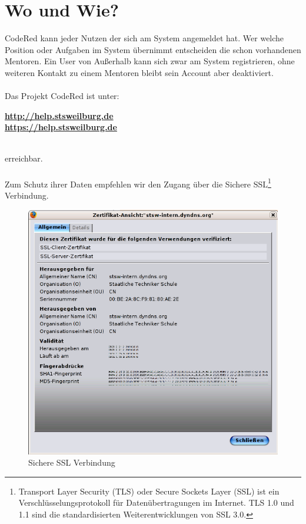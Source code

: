 \chapter{Wo und Wie?}  %
\label{chapter:Wo und Wie?}  %

CodeRed kann jeder Nutzen der sich am System angemeldet hat. Wer welche Position oder Aufgaben im System übernimmt entscheiden die schon vorhandenen Mentoren. Ein User von Außerhalb kann sich zwar am System registrieren, ohne weiteren Kontakt zu einem Mentoren bleibt sein Account aber deaktiviert.\\
\\
Das Projekt CodeRed ist unter:\\
\centerline{\href{http://help.stsweilburg.de}{\textbf{http://help.stsweilburg.de}}\\ \href{https://help.stsweilburg.de}{\textbf{https://help.stsweilburg.de}}} \\
erreichbar.\\
\\ 
Zum Schutz ihrer Daten empfehlen wir den Zugang über die Sichere SSL\footnote[1]{Transport Layer Security (TLS) oder Secure Sockets Layer (SSL) ist ein Verschlüsselungsprotokoll für Datenübertragungen im Internet. TLS 1.0 und 1.1 sind die standardisierten Weiterentwicklungen von SSL 3.0.} Verbindung.
\newpage
\begin{figure}[h]
\begin{center}
   \includegraphics[width=370pt]{../bilder/certs2.png}
   \caption{Sichere SSL Verbindung}
   \label{Sichere SSL Verbindung}
\end{center}
\end{figure}
